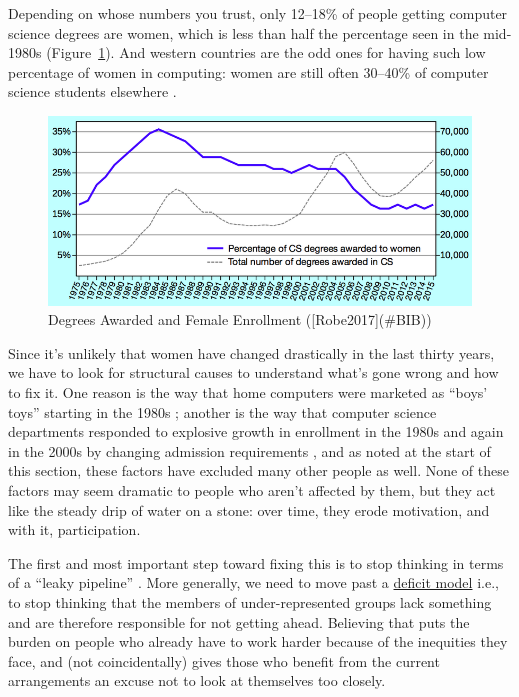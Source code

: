 Depending on whose numbers you trust, only 12--18\% of people getting
computer science degrees are women, which is less than half the
percentage seen in the mid-1980s (Figure~\ref{f:motivation-gender}). And
western countries are the odd ones for having such low percentage of
women in computing: women are still often 30--40\% of computer science
students elsewhere \cite{Galp2002,Varm2015}.

\begin{figure}
\centering
\includegraphics{../../figures/enrollment.png}
\caption{Degrees Awarded and Female Enrollment ({[}Robe2017{]}(\#BIB))}
\label{f:motivation-gender}
\end{figure}

Since it's unlikely that women have changed drastically in the last
thirty years, we have to look for structural causes to understand what's
gone wrong and how to fix it. One reason is the way that home computers
were marketed as ``boys' toys'' starting in the 1980s \cite{Marg2003};
another is the way that computer science departments responded to
explosive growth in enrollment in the 1980s and again in the 2000s by
changing admission requirements \cite{Robe2017}, and as noted at the
start of this section, these factors have excluded many other people as
well. None of these factors may seem dramatic to people who aren't
affected by them, but they act like the steady drip of water on a stone:
over time, they erode motivation, and with it, participation.

The first and most important step toward fixing this is to stop thinking
in terms of a ``leaky pipeline'' \cite{Mill2015}. More generally, we need to
move past a \protect\hyperlink{g:deficit-model}{deficit model} i.e., to stop
thinking that the members of under-represented groups lack something and
are therefore responsible for not getting ahead. Believing that puts the
burden on people who already have to work harder because of the
inequities they face, and (not coincidentally) gives those who benefit
from the current arrangements an excuse not to look at themselves too
closely.

